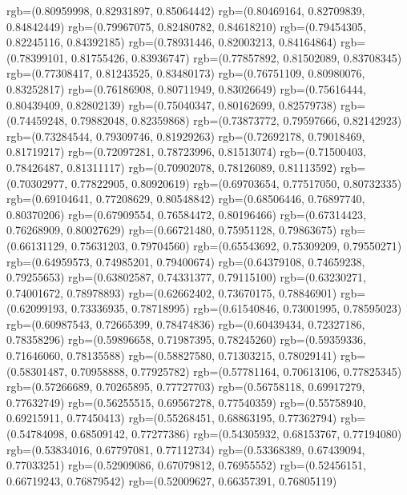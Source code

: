 {{        rgb=(0.80959998, 0.82931897, 0.85064442)
        rgb=(0.80469164, 0.82709839, 0.84842449)
        rgb=(0.79967075, 0.82480782, 0.84618210)
        rgb=(0.79454305, 0.82245116, 0.84392185)
        rgb=(0.78931446, 0.82003213, 0.84164864)
        rgb=(0.78399101, 0.81755426, 0.83936747)
        rgb=(0.77857892, 0.81502089, 0.83708345)
        rgb=(0.77308417, 0.81243525, 0.83480173)
        rgb=(0.76751109, 0.80980076, 0.83252817)
        rgb=(0.76186908, 0.80711949, 0.83026649)
        rgb=(0.75616444, 0.80439409, 0.82802139)
        rgb=(0.75040347, 0.80162699, 0.82579738)
        rgb=(0.74459248, 0.79882048, 0.82359868)
        rgb=(0.73873772, 0.79597666, 0.82142923)
        rgb=(0.73284544, 0.79309746, 0.81929263)
        rgb=(0.72692178, 0.79018469, 0.81719217)
        rgb=(0.72097281, 0.78723996, 0.81513074)
        rgb=(0.71500403, 0.78426487, 0.81311117)
        rgb=(0.70902078, 0.78126089, 0.81113592)
        rgb=(0.70302977, 0.77822905, 0.80920619)
        rgb=(0.69703654, 0.77517050, 0.80732335)
        rgb=(0.69104641, 0.77208629, 0.80548842)
        rgb=(0.68506446, 0.76897740, 0.80370206)
        rgb=(0.67909554, 0.76584472, 0.80196466)
        rgb=(0.67314423, 0.76268909, 0.80027629)
        rgb=(0.66721480, 0.75951128, 0.79863675)
        rgb=(0.66131129, 0.75631203, 0.79704560)
        rgb=(0.65543692, 0.75309209, 0.79550271)
        rgb=(0.64959573, 0.74985201, 0.79400674)
        rgb=(0.64379108, 0.74659238, 0.79255653)
        rgb=(0.63802587, 0.74331377, 0.79115100)
        rgb=(0.63230271, 0.74001672, 0.78978893)
        rgb=(0.62662402, 0.73670175, 0.78846901)
        rgb=(0.62099193, 0.73336935, 0.78718995)
        rgb=(0.61540846, 0.73001995, 0.78595023)
        rgb=(0.60987543, 0.72665399, 0.78474836)
        rgb=(0.60439434, 0.72327186, 0.78358296)
        rgb=(0.59896658, 0.71987395, 0.78245260)
        rgb=(0.59359336, 0.71646060, 0.78135588)
        rgb=(0.58827580, 0.71303215, 0.78029141)
        rgb=(0.58301487, 0.70958888, 0.77925782)
        rgb=(0.57781164, 0.70613106, 0.77825345)
        rgb=(0.57266689, 0.70265895, 0.77727703)
        rgb=(0.56758118, 0.69917279, 0.77632749)
        rgb=(0.56255515, 0.69567278, 0.77540359)
        rgb=(0.55758940, 0.69215911, 0.77450413)
        rgb=(0.55268451, 0.68863195, 0.77362794)
        rgb=(0.54784098, 0.68509142, 0.77277386)
        rgb=(0.54305932, 0.68153767, 0.77194080)
        rgb=(0.53834016, 0.67797081, 0.77112734)
        rgb=(0.53368389, 0.67439094, 0.77033251)
        rgb=(0.52909086, 0.67079812, 0.76955552)
        rgb=(0.52456151, 0.66719243, 0.76879542)
        rgb=(0.52009627, 0.66357391, 0.76805119)
}}
